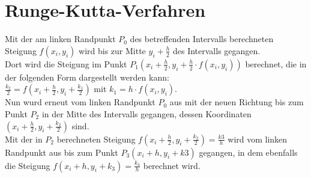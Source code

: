 \documentclass[fontset=ubuntu,12pt,a4paper]{scrreprt}
\begin{document}
\section{Runge-Kutta-Verfahren}
Mit der am linken Randpunkt \(P_0\) des betreffenden Intervalls berechneten Steigung \(f(x_i,y_i)\) wird bis zur Mitte \(y_i+\frac{h}{2}\) des Intervalls gegangen. \\
Dort wird die Steigung im Punkt \(P_1(x_i+\frac{h}{2}, y_i+\frac{h}{2}\cdot f(x_i,y_i))\) berechnet, die in der folgenden Form dargestellt werden kann: \\
\(\frac{k_2}{2}=f(x_i+\frac{h}{2}, y_i+\frac{k_1}{2})\) mit \(k_1=h\cdot f(x_i,y_i)\). \\
Nun wurd erneut vom linken Randpunkt \(P_0\) aus mit der neuen Richtung bis zum Punkt \(P_2\) in der Mitte des Intervalls gegangen, dessen Koordinaten \((x_i+\frac{h}{2},y_i+\frac{k_2}{2})\) sind. \\ Mit der in \(P_2\) berechneten Steigung \(f(x_i+\frac{h}{2},y_i+\frac{k_2}{2})=\frac{k3}{h}\) wird vom linken Randpunkt aus bis zum Punkt \(P_3(x_i+h,y_i+k3)\) gegangen, in dem ebenfalls die Steigung \(f(x_i+h,y_i+k_3)=\frac{k_4}{h}\) berechnet wird.
\end{document}
